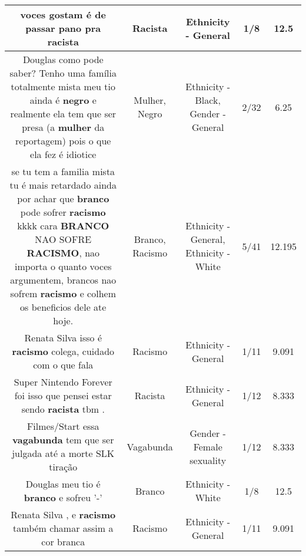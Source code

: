 \documentclass[11pt]{article}
\newlength\mylength
\begin{document}
\begin{center}
\begin{longtable}{|C{.65\mylength}|C{.30\mylength}|C{.12\mylength}|C{.12\mylength}|C{.12\mylength}|}
  \small voces gostam é de passar pano pra racista\normalsize   & Racista & Ethnicity - General & 1/8 & 12.5 \\  \hline
  \small Douglas como pode saber? Tenho uma família totalmente mista meu tio ainda é \textbf{negro} e realmente ela tem que ser presa (a \textbf{mulher} da reportagem) pois o que ela fez é idiotice\normalsize   & Mulher, Negro & Ethnicity - Black, Gender - General & 2/32 & 6.25 \\  \hline
  \small se tu tem a familia mista tu é mais retardado ainda por achar que \textbf{branco} pode sofrer \textbf{racismo} kkkk cara \textbf{BRANCO} NAO SOFRE \textbf{RACISMO}, nao importa o quanto voces argumentem, brancos nao sofrem \textbf{racismo} e colhem os beneficios dele ate hoje.\normalsize   & Branco, Racismo & Ethnicity - General, Ethnicity - White & 5/41 & 12.195 \\  \hline
  \small Renata Silva isso é \textbf{racismo} colega, cuidado com o que fala\normalsize   & Racismo & Ethnicity - General & 1/11 & 9.091 \\  \hline
  \small Super Nintendo Forever foi isso que pensei  estar sendo \textbf{racista} tbm .\normalsize   & Racista & Ethnicity - General & 1/12 & 8.333 \\  \hline
  \small Filmes/Start essa \textbf{vagabunda} tem que ser julgada até a morte SLK tiração\normalsize   & Vagabunda & Gender - Female sexuality & 1/12 & 8.333 \\  \hline
  \small Douglas meu tio é \textbf{branco} e sofreu '-'\normalsize   & Branco & Ethnicity - White & 1/8 & 12.5 \\  \hline
  \small Renata Silva , e \textbf{racismo} também chamar assim a cor branca\normalsize   & Racismo & Ethnicity - General & 1/11 & 9.091 \\  \hline

\end{longtable}
\end{center}
\end{document}
